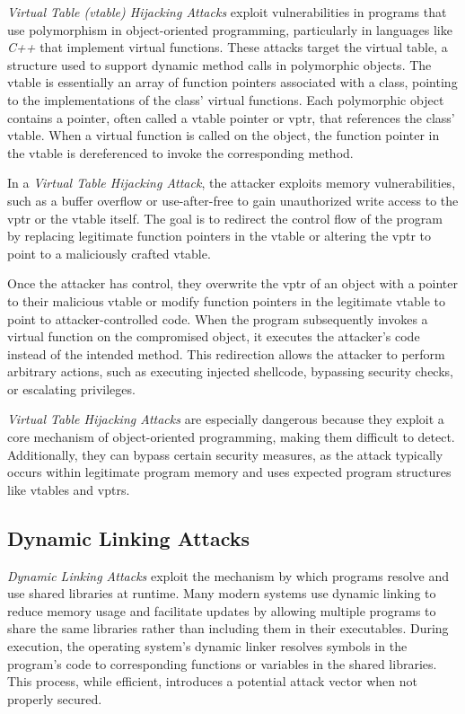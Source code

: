 \textit{Virtual Table (vtable) Hijacking Attacks} exploit vulnerabilities in programs
that use polymorphism in object-oriented programming, particularly in languages
like \textit{C++} that implement virtual functions. These attacks target the
virtual table, a structure used to support dynamic method calls in polymorphic objects.
The vtable is essentially an array of function pointers associated with a class,
pointing to the implementations of the class' virtual functions. Each polymorphic
object contains a pointer, often called a vtable pointer or vptr, that references
the class' vtable. When a virtual function is called on the object, the function
pointer in the vtable is dereferenced to invoke the corresponding method.

In a \textit{Virtual Table Hijacking Attack}, the attacker exploits memory
vulnerabilities, such as a buffer overflow or use-after-free to gain unauthorized
write access to the vptr or the vtable itself. The goal is to redirect the
control flow of the program by replacing legitimate function pointers in the
vtable or altering the vptr to point to a maliciously crafted vtable.

Once the attacker has control, they overwrite the vptr of an object with a pointer
to their malicious vtable or modify function pointers in the legitimate vtable to
point to attacker-controlled code. When the program subsequently invokes a
virtual function on the compromised object, it executes the attacker's code instead
of the intended method. This redirection allows the attacker to perform
arbitrary actions, such as executing injected shellcode, bypassing security
checks, or escalating privileges.

\textit{Virtual Table Hijacking Attacks} are especially dangerous because they
exploit a core mechanism of object-oriented programming, making them difficult to
detect. Additionally, they can bypass certain security measures, as the attack
typically occurs within legitimate program memory and uses expected program
structures like vtables and vptrs.

\subsection{Dynamic Linking Attacks}
\label{subsec:background_dynamiclinking}

\textit{Dynamic Linking Attacks} exploit the mechanism by which programs resolve
and use shared libraries at runtime. Many modern systems use dynamic linking to reduce
memory usage and facilitate updates by allowing multiple programs to share the same
libraries rather than including them in their executables. During execution, the
operating system's dynamic linker resolves symbols in the program's code to corresponding
functions or variables in the shared libraries. This process, while efficient,
introduces a potential attack vector when not properly secured.

